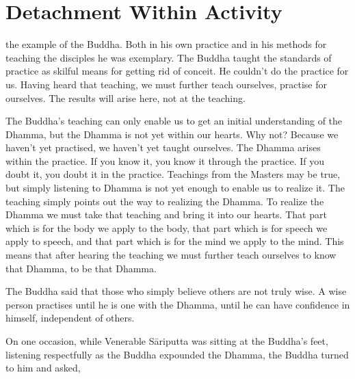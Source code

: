 

\chapter{Detachment Within Activity}

 the example of the Buddha. Both in his own practice and in his methods for teaching the disciples he was exemplary. The Buddha taught the standards of practice as skilful means for getting rid of conceit. He couldn't do the practice for us. Having heard that teaching, we must further teach ourselves, practise for ourselves. The results will arise here, not at the teaching. 

The Buddha's teaching can only enable us to get an initial understanding of the Dhamma, but the Dhamma is not yet within our hearts. Why not? Because we haven't yet practised, we haven't yet taught ourselves. The Dhamma arises within the practice. If you know it, you know it through the practice. If you doubt it, you doubt it in the practice. Teachings from the Masters may be true, but simply listening to Dhamma is not yet enough to enable us to realize it. The teaching simply points out the way to realizing the Dhamma. To realize the Dhamma we must take that teaching and bring it into our hearts. That part which is for the body we apply to the body, that part which is for speech we apply to  speech, and that part which is for the mind we apply to the mind. This means that after hearing the teaching we must further teach ourselves to know that Dhamma, to be that Dhamma. 

The Buddha said that those who simply believe others are not truly wise. A wise person practises until he is one with the Dhamma, until he can have confidence in himself, independent of others. 

On one occasion, while Venerable S\=ariputta was sitting at the Buddha's feet, listening respectfully as the Buddha expounded the Dhamma, the Buddha turned to him and asked, 

